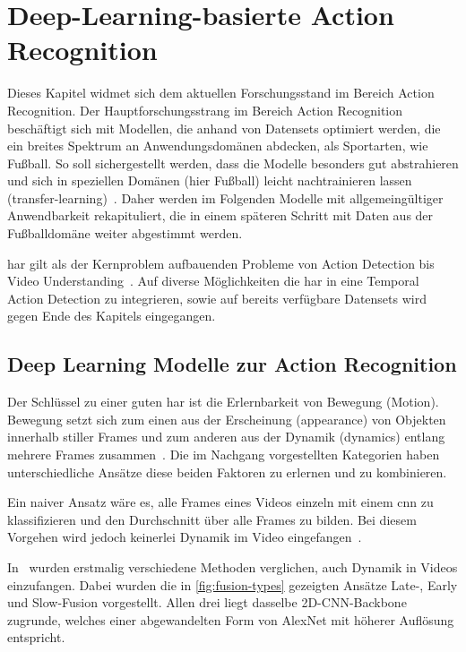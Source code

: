 \chapter{Deep-Learning-basierte Action Recognition}
\label{ch:sota}

Dieses Kapitel widmet sich dem aktuellen Forschungsstand im Bereich Action Recognition.
Der Hauptforschungsstrang im Bereich Action Recognition beschäftigt sich mit Modellen, die anhand von Datensets optimiert werden, die ein breites Spektrum an Anwendungsdomänen abdecken, als Sportarten, wie Fußball.
So soll sichergestellt werden, dass die Modelle besonders gut abstrahieren und sich in speziellen Domänen (hier Fußball) leicht nachtrainieren lassen (\gls{transfer-learning})~\cite{Burkov19}.
Daher werden im Folgenden Modelle mit allgemeingültiger Anwendbarkeit rekapituliert, die in einem späteren Schritt mit Daten aus der Fußballdomäne weiter abgestimmt werden.

\gls{har} gilt als der Kernproblem aufbauenden Probleme von Action Detection bis Video Understanding~\cite{Jiang19,Xia20}.
Auf diverse Möglichkeiten die \gls{har} in eine Temporal Action Detection zu integrieren, sowie auf bereits verfügbare Datensets wird gegen Ende des Kapitels eingegangen.

\section{Deep Learning Modelle zur Action Recognition}
\label{sec:deep-learning-modelle-zur-action-recognition}

Der Schlüssel zu einer guten \gls{har} ist die Erlernbarkeit von Bewegung (Motion).
Bewegung setzt sich zum einen aus der Erscheinung (appearance) von Objekten innerhalb stiller Frames und zum anderen aus der Dynamik (dynamics) entlang mehrere Frames zusammen~\cite{Sun15,Wang16}.
Die im Nachgang vorgestellten Kategorien haben unterschiedliche Ansätze diese beiden Faktoren zu erlernen und zu kombinieren.

Ein naiver Ansatz wäre es, alle Frames eines Videos einzeln mit einem \gls{cnn} zu klassifizieren und den Durchschnitt über alle Frames zu bilden.
Bei diesem Vorgehen wird jedoch keinerlei Dynamik im Video eingefangen~\cite{Karpathy14}.

In~\cite{Karpathy14} wurden erstmalig verschiedene Methoden verglichen, auch Dynamik in Videos einzufangen.
Dabei wurden die in \autoref{fig:fusion-types} gezeigten Ansätze Late-, Early und Slow-Fusion vorgestellt.
Allen drei liegt dasselbe 2D-CNN-Backbone zugrunde, welches einer abgewandelten Form von AlexNet mit höherer Auflösung entspricht.

